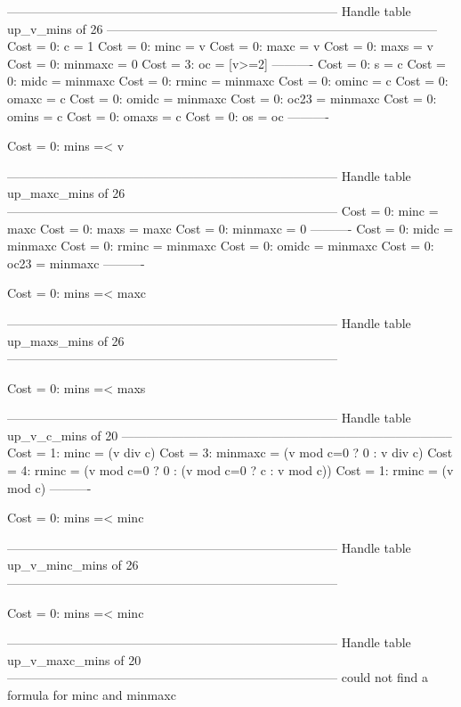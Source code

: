 --------------------------------------------------------------------------------
Handle table up_v_mins of 26
--------------------------------------------------------------------------------
Cost =  0:  c       = 1
Cost =  0:  minc    = v
Cost =  0:  maxc    = v
Cost =  0:  maxs    = v
Cost =  0:  minmaxc = 0
Cost =  3:  oc      = [v>=2]
----------
Cost =  0:  s       = c
Cost =  0:  midc    = minmaxc
Cost =  0:  rminc   = minmaxc
Cost =  0:  ominc   = c
Cost =  0:  omaxc   = c
Cost =  0:  omidc   = minmaxc
Cost =  0:  oc23    = minmaxc
Cost =  0:  omins   = c
Cost =  0:  omaxs   = c
Cost =  0:  os      = oc
----------

Cost =  0:  mins =< v

--------------------------------------------------------------------------------
Handle table up_maxc_mins of 26
--------------------------------------------------------------------------------
Cost =  0:  minc    = maxc
Cost =  0:  maxs    = maxc
Cost =  0:  minmaxc = 0
----------
Cost =  0:  midc    = minmaxc
Cost =  0:  rminc   = minmaxc
Cost =  0:  omidc   = minmaxc
Cost =  0:  oc23    = minmaxc
----------

Cost =  0:  mins =< maxc

--------------------------------------------------------------------------------
Handle table up_maxs_mins of 26
--------------------------------------------------------------------------------

Cost =  0:  mins =< maxs

--------------------------------------------------------------------------------
Handle table up_v_c_mins of 20
--------------------------------------------------------------------------------
Cost =  1:  minc    = (v div c)
Cost =  3:  minmaxc = (v mod c=0 ? 0 : v div c)
Cost =  4:  rminc   = (v mod c=0 ? 0 : (v mod c=0 ? c : v mod c))
Cost =  1:  rminc   = (v mod c)
----------

Cost =  0:  mins =< minc

--------------------------------------------------------------------------------
Handle table up_v_minc_mins of 26
--------------------------------------------------------------------------------

Cost =  0:  mins =< minc

--------------------------------------------------------------------------------
Handle table up_v_maxc_mins of 20
--------------------------------------------------------------------------------
could not find a formula for minc and minmaxc

